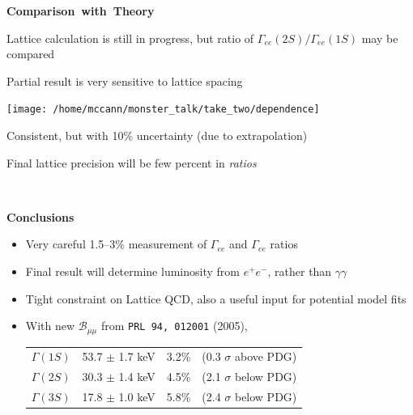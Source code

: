 \documentclass[landscape]{article}
\newenvironment{slide}[1][ ]{\mbox{\bf #1 } \vfill}{\vfill \mbox{ } \pagebreak}
\begin{document}
\begin{slide}[Comparison with Theory]

\vspace{0.5 cm}
Lattice calculation is still in progress, but ratio of $\Gamma_{ee}(2S)/\Gamma_{ee}(1S)$ may be compared

\vspace{0.5 cm}
Partial result is very sensitive to lattice spacing \hfill {}

\vspace{0.5 cm}
\begin{center}
  \texttt{[image: /home/mccann/monster\_talk/take\_two/dependence]}
\end{center}

\vspace{0.5 cm}
Consistent, but with 10\% uncertainty (due to extrapolation)

\vspace{0.5 cm}
Final lattice precision will be few percent in {\it ratios}

\vspace{-1 cm}

\end{slide}

\begin{slide}[Conclusions]

\renewcommand{\labelitemi}{}
\begin{itemize}\setlength{\itemsep}{1.5 cm}

  \item Very careful 1.5--3\% measurement of $\Gamma_{ee}$ and $\Gamma_{ee}$ ratios

  \item Final result will determine luminosity from $e^+e^-$, rather than $\gamma\gamma$

  \item Tight constraint on Lattice QCD, also a useful input for potential model fits

  \item With new $\mathcal{B}_{\mu\mu}$ from {\tt PRL 94, 012001} (2005),

\begin{center}
  \renewcommand{\arraystretch}{2}
  \begin{tabular}{c c c c}
    $\Gamma(1S)$ & \mbox{\hspace{0.5 cm}} 53.7 $\pm$ 1.7 keV \mbox{\hspace{0.5 cm}} & 3.2\% & \mbox{\hspace{0.5 cm}} (0.3 $\sigma$ above PDG) \mbox{\hspace{0.5 cm}} \\
    $\Gamma(2S)$ & 30.3 $\pm$ 1.4 keV & 4.5\% & (2.1 $\sigma$ below PDG) \\
    $\Gamma(3S)$ & 17.8 $\pm$ 1.0 keV & 5.8\% & (2.4 $\sigma$ below PDG)
  \end{tabular}
\end{center}

\end{itemize}

\end{slide}
\end{document}
